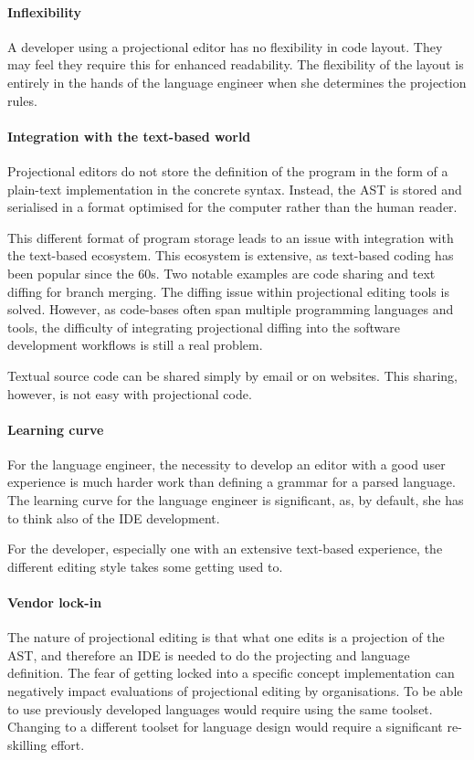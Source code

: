 \paragraph{Inflexibility} A developer using a projectional editor has no flexibility in code layout. They may feel they require this for enhanced readability.
The flexibility of the layout is entirely in the hands of the language engineer when she determines the projection rules.

\paragraph{Integration with the text-based world} Projectional editors do not store the definition of the program in the form of a plain-text implementation in the concrete syntax.
Instead, the AST is stored and serialised in a format optimised for the computer rather than the human reader.

This different format of program storage leads to an issue with integration with the text-based ecosystem.
This ecosystem is extensive, as text-based coding has been popular since the 60s.
Two notable examples are code sharing and text diffing for branch merging.
The diffing issue within projectional editing tools is solved.
However, as code-bases often span multiple programming languages and tools, the difficulty of integrating projectional diffing into the software development workflows is still a real problem.

Textual source code can be shared simply by email or on websites. 
This sharing, however, is not easy with projectional code.

\paragraph{Learning curve} For the language engineer, the necessity to develop an editor with a good user experience is much harder work than defining a grammar for a parsed language.
The learning curve for the language engineer is significant, as, by default, she has to think also of the IDE development.

For the developer, especially one with an extensive text-based experience, the different editing style takes some getting used to.

\paragraph{Vendor lock-in} The nature of projectional editing is that what one edits is a projection of the AST, and therefore an IDE is needed to do the projecting and language definition.
The fear of getting locked into a specific concept implementation can negatively impact evaluations of projectional editing by organisations.
To be able to use previously developed languages would require using the same toolset.
Changing to a different toolset for language design would require a significant re-skilling effort.